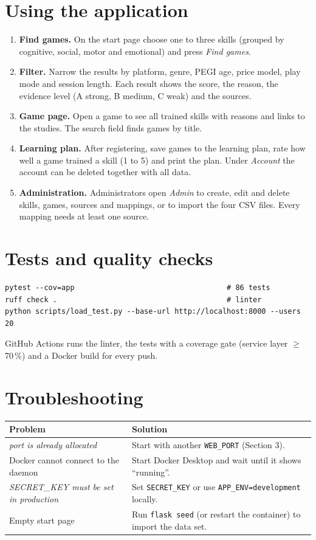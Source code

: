 \documentclass[a4paper,11pt]{article}
\begin{document}
\section{Using the application}
\begin{enumerate}[leftmargin=*]
\item \textbf{Find games.} On the start page choose one to three skills (grouped by
  cognitive, social, motor and emotional) and press \emph{Find games}.
\item \textbf{Filter.} Narrow the results by platform, genre, PEGI age, price model,
  play mode and session length. Each result shows the score, the reason, the
  evidence level (A strong, B medium, C weak) and the sources.
\item \textbf{Game page.} Open a game to see all trained skills with reasons and
  links to the studies. The search field finds games by title.
\item \textbf{Learning plan.} After registering, save games to the learning plan, rate
  how well a game trained a skill (1 to 5) and print the plan. Under
  \emph{Account} the account can be deleted together with all data.
\item \textbf{Administration.} Administrators open \emph{Admin} to create, edit and
  delete skills, games, sources and mappings, or to import the four CSV files.
  Every mapping needs at least one source.
\end{enumerate}

\section{Tests and quality checks}
\begin{Verbatim}
pytest --cov=app                                   # 86 tests
ruff check .                                       # linter
python scripts/load_test.py --base-url http://localhost:8000 --users 20
\end{Verbatim}

GitHub Actions runs the linter, the tests with a coverage gate (service layer
$\geq$ 70\,\%) and a Docker build for every push.

\section{Troubleshooting}
\begin{tabularx}{\textwidth}{|L{5.2cm}|X|}
\hline
\textbf{Problem} & \textbf{Solution} \\ \hline
\emph{port is already allocated} & Start with another \texttt{WEB\_PORT} (Section 3). \\ \hline
Docker cannot connect to the daemon & Start Docker Desktop and wait until it shows ``running''. \\ \hline
\emph{SECRET\_KEY must be set in production} & Set \texttt{SECRET\_KEY} or use \texttt{APP\_ENV=development} locally. \\ \hline
Empty start page & Run \texttt{flask seed} (or restart the container) to import the data set. \\ \hline
\end{tabularx}
\end{document}
